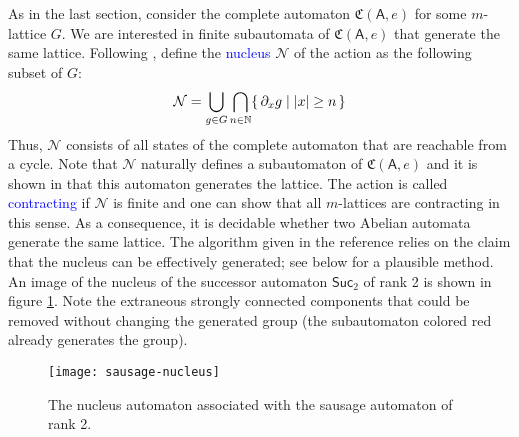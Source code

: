 \documentclass[12pt]{svmult}
\def\emph#1{\textcolor{blue}{#1}}
\def\SUC#1{\mathsf{Suc}_{#1}}
\def\cN{\mathcal{N}}
\def\N{\mathbb{N}}
\def\resid#1#2{\partial_{#1}{#2}}         %
\def\set#1#2{\{\, {#1} \mid {#2}\,\}}
\def\AA{\mathsf{A}}             %
\def\cmpaut{\fC}                %
\def\fC{\mathfrak{C}}           %
\DeclarePairedDelimiter\card{|}{|}
\begin{document}
As in the last section, consider the complete automaton  $\cmpaut(\AA,e)$ 
for some $m$-lattice $G$.
We are interested in finite subautomata of  $\cmpaut(\AA,e)$ that generate the same 
lattice. 
Following \cite{Nekrashevych05:self_similar_groups}, 
define the \emph{nucleus} $\cN$ of the action as the following subset of $G$:
%
$$
    \cN = \bigcup_{g \in G} \bigcap_{n \in \N} \set{ \resid{x}{g} }{ \card{x} \geq n }
$$
%
Thus, $\cN$ consists of all states of the complete automaton that are reachable from 
a cycle. 
Note that $\cN$ naturally defines a subautomaton of $\cmpaut(\AA,e)$ and it is shown
in \cite{Nekrashevych05:self_similar_groups} that this automaton generates the lattice. 
The action is called \emph{contracting} if $\cN$ is finite and one can show that 
all $m$-lattices are contracting in this sense. 
As a consequence, it is decidable whether two Abelian automata generate the same 
lattice. 
The algorithm given in the reference relies on the claim that the nucleus can be 
effectively generated; see below for a plausible method.  
An image of the nucleus of the successor automaton $\SUC{2}$ of rank 2 is shown in 
figure \ref{fig:sausage-nucleus}. 
Note the extraneous strongly connected components that could be removed without 
changing the generated group (the subautomaton colored red already generates the 
group). 

\vspace{3ex} 
\begin{figure}[t]
  \centering
  \texttt{[image: sausage-nucleus]}
  \caption{The nucleus automaton associated with the sausage automaton of 
  rank 2.}
  \label{fig:sausage-nucleus}
\end{figure}


\end{document}
